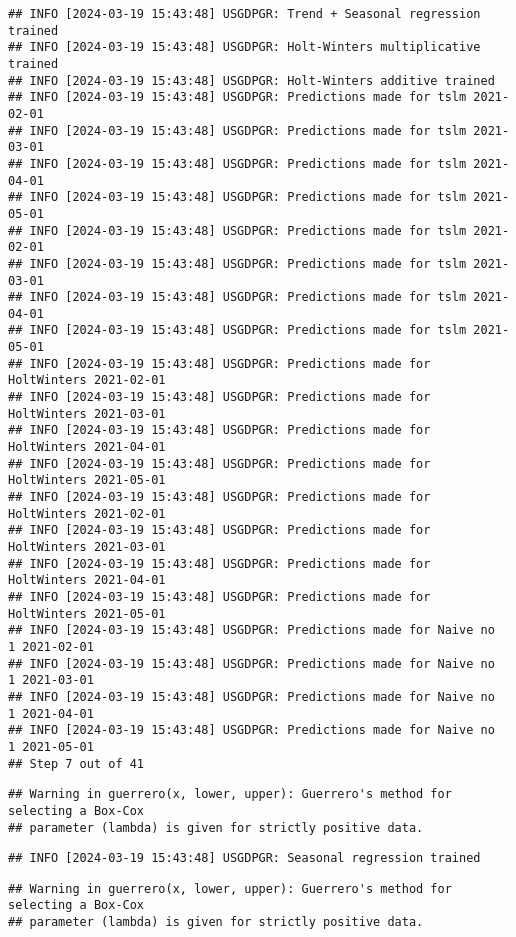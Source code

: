 \documentclass[
]{article}
\begin{document}
\begin{verbatim}
## INFO [2024-03-19 15:43:48] USGDPGR: Trend + Seasonal regression trained
## INFO [2024-03-19 15:43:48] USGDPGR: Holt-Winters multiplicative trained
## INFO [2024-03-19 15:43:48] USGDPGR: Holt-Winters additive trained
## INFO [2024-03-19 15:43:48] USGDPGR: Predictions made for tslm 2021-02-01
## INFO [2024-03-19 15:43:48] USGDPGR: Predictions made for tslm 2021-03-01
## INFO [2024-03-19 15:43:48] USGDPGR: Predictions made for tslm 2021-04-01
## INFO [2024-03-19 15:43:48] USGDPGR: Predictions made for tslm 2021-05-01
## INFO [2024-03-19 15:43:48] USGDPGR: Predictions made for tslm 2021-02-01
## INFO [2024-03-19 15:43:48] USGDPGR: Predictions made for tslm 2021-03-01
## INFO [2024-03-19 15:43:48] USGDPGR: Predictions made for tslm 2021-04-01
## INFO [2024-03-19 15:43:48] USGDPGR: Predictions made for tslm 2021-05-01
## INFO [2024-03-19 15:43:48] USGDPGR: Predictions made for HoltWinters 2021-02-01
## INFO [2024-03-19 15:43:48] USGDPGR: Predictions made for HoltWinters 2021-03-01
## INFO [2024-03-19 15:43:48] USGDPGR: Predictions made for HoltWinters 2021-04-01
## INFO [2024-03-19 15:43:48] USGDPGR: Predictions made for HoltWinters 2021-05-01
## INFO [2024-03-19 15:43:48] USGDPGR: Predictions made for HoltWinters 2021-02-01
## INFO [2024-03-19 15:43:48] USGDPGR: Predictions made for HoltWinters 2021-03-01
## INFO [2024-03-19 15:43:48] USGDPGR: Predictions made for HoltWinters 2021-04-01
## INFO [2024-03-19 15:43:48] USGDPGR: Predictions made for HoltWinters 2021-05-01
## INFO [2024-03-19 15:43:48] USGDPGR: Predictions made for Naive no  1 2021-02-01
## INFO [2024-03-19 15:43:48] USGDPGR: Predictions made for Naive no  1 2021-03-01
## INFO [2024-03-19 15:43:48] USGDPGR: Predictions made for Naive no  1 2021-04-01
## INFO [2024-03-19 15:43:48] USGDPGR: Predictions made for Naive no  1 2021-05-01
## Step 7 out of 41
\end{verbatim}

\begin{verbatim}
## Warning in guerrero(x, lower, upper): Guerrero's method for selecting a Box-Cox
## parameter (lambda) is given for strictly positive data.
\end{verbatim}

\begin{verbatim}
## INFO [2024-03-19 15:43:48] USGDPGR: Seasonal regression trained
\end{verbatim}

\begin{verbatim}
## Warning in guerrero(x, lower, upper): Guerrero's method for selecting a Box-Cox
## parameter (lambda) is given for strictly positive data.
\end{verbatim}
\end{document}
